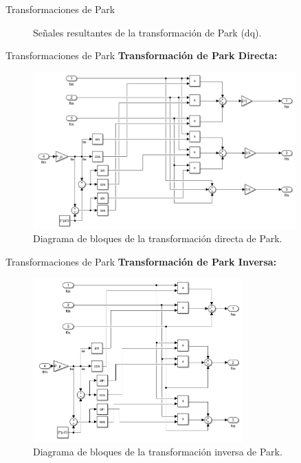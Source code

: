 \documentclass[12pt]{beamer}
\begin{document}
\begin{frame}{Transformaciones de Park}
\begin{figure}[H]
\begin{minipage}[t]{0.35\textwidth}
            \caption{Señales resultantes de la transformación de Park (dq).}
        \end{minipage}
    \end{figure}
\end{frame}

\begin{frame}{Transformaciones de Park}\footnotesize
    \textbf{Transformación de Park Directa:}  
    \begin{figure}[h]
        \centering
        \includegraphics[width=0.9\textwidth]{Imagenes/ParkDirecta.png}
        \caption{Diagrama de bloques de la transformación directa de Park.}
    \end{figure}
\end{frame}

\begin{frame}{Transformaciones de Park}\footnotesize
    \textbf{Transformación de Park Inversa:}   
    \begin{figure}[h]
        \centering
        \includegraphics[width=0.72\textwidth]{Imagenes/ParkInversa.png}
        \caption{Diagrama de bloques de la transformación inversa de Park.}
    \end{figure}
\end{frame}
\end{document}

